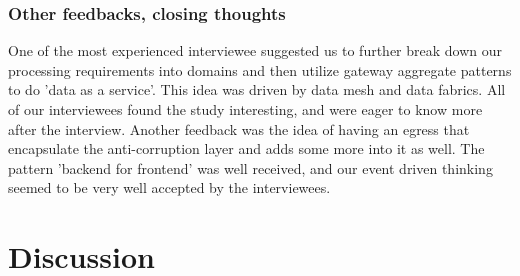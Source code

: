 \documentclass[a4paper,11pt,article,oneside]{memoir}
\begin{document}




\subsection{Other feedbacks, closing thoughts}


One of the most experienced interviewee suggested us to further break down our processing requirements into domains and then utilize gateway aggregate patterns to do 'data as a service'. This idea was driven by data mesh and data fabrics. All of our interviewees found the study interesting, and were eager to know more after the interview. Another feedback was the idea of having an egress that encapsulate the anti-corruption layer and adds some more into it as well. The pattern 'backend for frontend' was well received, and our event driven thinking seemed to be very well accepted by the interviewees. 






\chapter{Discussion}
\end{document}
